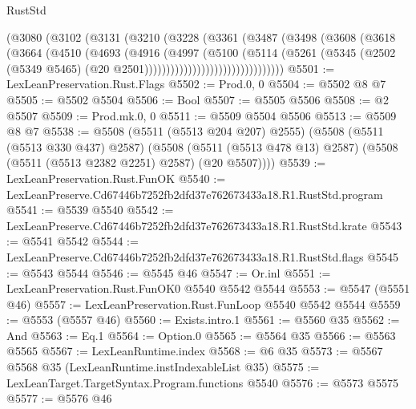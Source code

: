 \begin{lexlean}{RustStd}
\begin{coremodule}
                          (@3080
                            (@3102
                              (@3131
                                (@3210
                                  (@3228
                                    (@3361
                                      (@3487
                                        (@3498
                                          (@3608
                                            (@3618
                                              (@3664
                                                (@4510
                                                  (@4693
                                                    (@4916
                                                      (@4997
                                                        (@5100
                                                          (@5114
                                                            (@5261
                                                              (@5345
                                                                (@2502
                                                                  (@5349 @5465)
                                                                  (@20
                                                                    @2501))))))))))))))))))))))))))))))))
@5501 := LexLeanPreservation.Rust.Flags
@5502 := Prod.{0, 0}
@5504 := @5502 @8 @7
@5505 := @5502 @5504
@5506 := Bool
@5507 := @5505 @5506
@5508 := @2 @5507
@5509 := Prod.mk.{0, 0}
@5511 := @5509 @5504 @5506
@5513 := @5509 @8 @7
@5538 := @5508
    (@5511 (@5513 @204 @207) @2555)
    (@5508
      (@5511 (@5513 @330 @437) @2587)
      (@5508 (@5511 (@5513 @478 @13) @2587) (@5508 (@5511 (@5513 @2382 @2251) @2587) (@20 @5507))))
@5539 := LexLeanPreservation.Rust.FunOK
@5540 := LexLeanPreserve.Cd67446b7252fb2dfd37e762673433a18.R1.RustStd.program
@5541 := @5539 @5540
@5542 := LexLeanPreserve.Cd67446b7252fb2dfd37e762673433a18.R1.RustStd.krate
@5543 := @5541 @5542
@5544 := LexLeanPreserve.Cd67446b7252fb2dfd37e762673433a18.R1.RustStd.flags
@5545 := @5543 @5544
@5546 := @5545 @46
@5547 := Or.inl
@5551 := LexLeanPreservation.Rust.FunOK0 @5540 @5542 @5544
@5553 := @5547 (@5551 @46)
@5557 := LexLeanPreservation.Rust.FunLoop @5540 @5542 @5544
@5559 := @5553 (@5557 @46)
@5560 := Exists.intro.{1}
@5561 := @5560 @35
@5562 := And
@5563 := Eq.{1}
@5564 := Option.{0}
@5565 := @5564 @35
@5566 := @5563 @5565
@5567 := LexLeanRuntime.index
@5568 := @6 @35
@5573 := @5567 @5568 @35 (LexLeanRuntime.instIndexableList @35)
@5575 := LexLeanTarget.TargetSyntax.Program.functions @5540
@5576 := @5573 @5575
@5577 := @5576 @46

\end{coremodule}
\end{lexlean}
